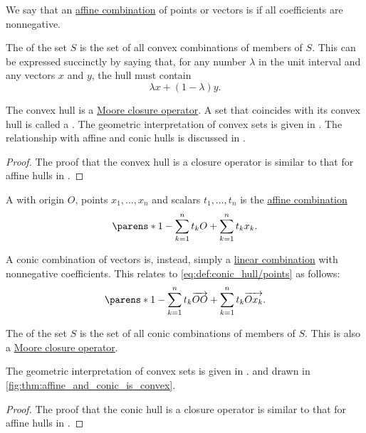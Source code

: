 \begin{definition}\label{def:convex_hull}\mimprovised
  We say that an \hyperref[def:affine_combinations]{affine combination} of points or vectors is  if all coefficients are nonnegative.

  The  of the set \( S \) is the set of all convex combinations of members of \( S \). This can be expressed succinctly by saying that, for any number \( \lambda \) in the unit interval and any vectors \( x \) and \( y \), the hull must contain
  \begin{equation}\label{eq:def:convex_hull/combination}
    \lambda x + (1 - \lambda) y.
  \end{equation}

  The convex hull is a \hyperref[def:moore_closure_operator]{Moore closure operator}. A set that coincides with its convex hull is called a . The geometric interpretation of convex sets is given in . The relationship with affine and conic hulls is discussed in .
\end{definition}
\begin{proof}
  The proof that the convex hull is a closure operator is similar to that for affine hulls in .
\end{proof}

\begin{definition}\label{def:conic_hull}\mimprovised
  A  with origin \( O \), points \( x_1, \ldots, x_n \) and  scalars \( t_1, \ldots, t_n \) is the \hyperref[def:affine_combinations]{affine combination}
  \begin{equation}\label{eq:def:conic_hull/points}
    \parens*{ 1 - \sum_{k=1}^n t_k } O + \sum_{k=1}^n t_k x_k.
  \end{equation}

  A conic combination of vectors is, instead, simply a \hyperref[rem:linear_combinations]{linear combination} with nonnegative coefficients. This relates to \eqref{eq:def:conic_hull/points} as follows:
  \begin{equation*}
    \parens*{ 1 - \sum_{k=1}^n t_k } \vect{OO} + \sum_{k=1}^n t_k \vect{O x_k}.
  \end{equation*}

  The  of the set \( S \) is the set of all conic combinations of members of \( S \). This is also a \hyperref[def:moore_closure_operator]{Moore closure operator}.

  The geometric interpretation of convex sets is given in . and drawn in \cref{fig:thm:affine_and_conic_is_convex}.
\end{definition}
\begin{proof}
  The proof that the conic hull is a closure operator is similar to that for affine hulls in .
\end{proof}

